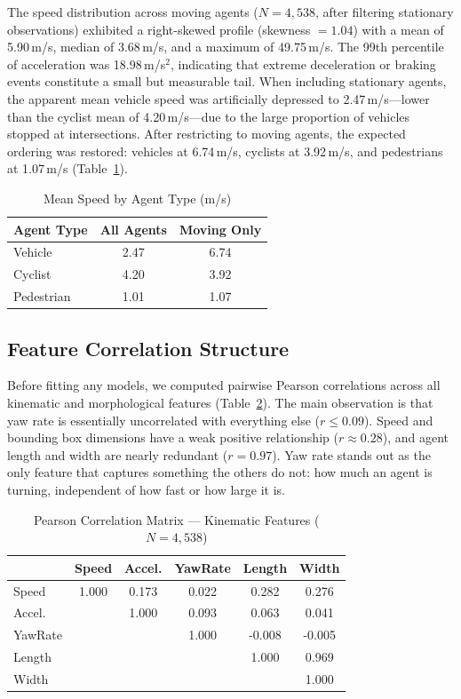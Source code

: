 \documentclass[conference]{IEEEtran}
\begin{document}
The speed distribution across moving agents ($N = 4{,}538$, after filtering stationary observations) exhibited a right-skewed profile (skewness $= 1.04$) with a mean of 5.90\,m/s, median of 3.68\,m/s, and a maximum of 49.75\,m/s. The 99th percentile of acceleration was 18.98\,m/s$^2$, indicating that extreme deceleration or braking events constitute a small but measurable tail. When including stationary agents, the apparent mean vehicle speed was artificially depressed to 2.47\,m/s---lower than the cyclist mean of 4.20\,m/s---due to the large proportion of vehicles stopped at intersections. After restricting to moving agents, the expected ordering was restored: vehicles at 6.74\,m/s, cyclists at 3.92\,m/s, and pedestrians at 1.07\,m/s (Table~\ref{tab:speeds}).

\begin{table}[h]
\centering
\caption{Mean Speed by Agent Type (m/s)}
\label{tab:speeds}
\begin{tabular}{lcc}
\toprule
Agent Type & All Agents & Moving Only \\
\midrule
Vehicle    & 2.47       & 6.74        \\
Cyclist    & 4.20       & 3.92        \\
Pedestrian & 1.01       & 1.07        \\
\bottomrule
\end{tabular}
\end{table}

\subsection{Feature Correlation Structure}

Before fitting any models, we computed pairwise Pearson correlations across all kinematic and morphological features (Table~\ref{tab:corr}). The main observation is that yaw rate is essentially uncorrelated with everything else ($r \leq 0.09$). Speed and bounding box dimensions have a weak positive relationship ($r \approx 0.28$), and agent length and width are nearly redundant ($r = 0.97$). Yaw rate stands out as the only feature that captures something the others do not: how much an agent is turning, independent of how fast or how large it is.

\begin{table}[h]
\centering
\caption{Pearson Correlation Matrix — Kinematic Features ($N = 4{,}538$)}
\label{tab:corr}
\begin{tabular}{lccccc}
\toprule
 & Speed & Accel. & YawRate & Length & Width \\
\midrule
Speed    & 1.000 & 0.173 & 0.022 & 0.282 & 0.276 \\
Accel.   &       & 1.000 & 0.093 & 0.063 & 0.041 \\
YawRate  &       &       & 1.000 & -0.008 & -0.005 \\
Length   &       &       &       & 1.000 & 0.969 \\
Width    &       &       &       &       & 1.000 \\
\bottomrule
\end{tabular}
\end{table}
\end{document}
